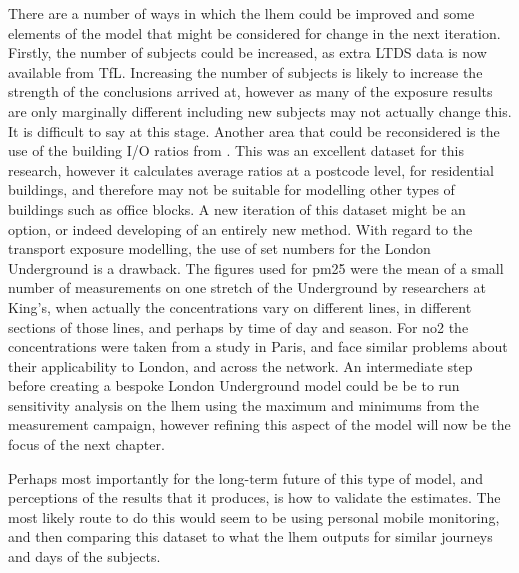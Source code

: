 There are a number of ways in which the \gls{lhem} could be improved and some elements of the model that might be considered for change in the next iteration. Firstly, the number of subjects could be increased, as extra LTDS data is now available from TfL. Increasing the number of subjects is likely to increase the strength of the conclusions arrived at, however as many of the exposure results are only marginally different including new subjects may not actually change this. It is difficult to say at this stage.
Another area that could be reconsidered is the use of the building I/O ratios from \cite{Taylor2014}. This was an excellent dataset for this research, however it calculates average ratios at a postcode level, for residential buildings, and therefore may not be suitable for modelling other types of buildings such as office blocks. A new iteration of this dataset might be an option, or indeed developing of an entirely new method.
With regard to the transport exposure modelling, the use of set numbers for the London Underground is a drawback. The figures used for \gls{pm25} were the mean of a small number of measurements on one stretch of the Underground by researchers at King's, when actually the concentrations vary on different lines, in different sections of those lines, and perhaps by time of day and season. For \gls{no2} the concentrations were taken from a study in Paris, and face similar problems about their applicability to London, and across the network. An intermediate step before creating a bespoke London Underground model could be be to run sensitivity analysis on the \gls{lhem} using the maximum and minimums from the measurement campaign, however refining this aspect of the model will now be the focus of the next chapter.

Perhaps most importantly for the long-term future of this type of model, and perceptions of the results that it produces, is how to validate the estimates. The most likely route to do this would seem to be using personal mobile monitoring, and then comparing this dataset to what the \gls{lhem} outputs for similar journeys and days of the subjects.



